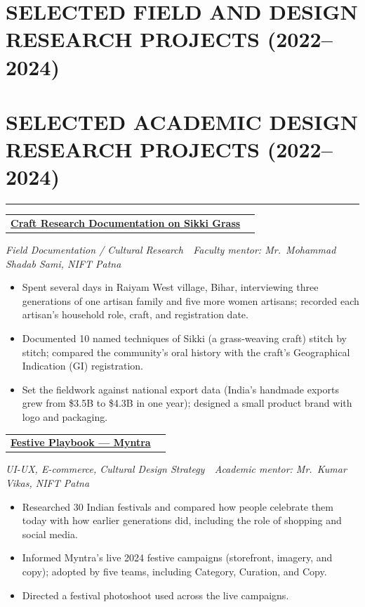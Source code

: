 \documentclass[10pt,letterpaper]{article}
\makeatletter
\newcommand{\weblink}[2]{\href{#1}{\textbf{#2}}}
\newcommand{\sectionrule}{\par\vspace{-2pt}\noindent\rule{\linewidth}{0.4pt}\par\vspace{2pt}}
\newenvironment{spread}[2][\normalsize]{\par\begingroup\linespread{#2}#1\selectfont}{\par\endgroup}
\newcommand{\entry}[2]{%
  \par\noindent
  \begin{tabularx}{\linewidth}{@{}X r@{}}
    \textbf{#1} & \normalfont #2
  \end{tabularx}\par
}
\newcommand{\entrygap}{\vspace{5pt}}
\newcommand{\subline}[1]{{\setlength{\rightskip}{2.7em}\itshape\small #1\par}\vspace{1pt}}
\makeatother
\begin{document}
\begin{spread}{1.07}
\ifdefined\EDRES \acceptedSection \else \preprintsSection \fi

\ifdefined\EDRES
\section{\MakeUppercase{Selected Field and Design Research Projects (2022--2024)}}
\else
\section{\MakeUppercase{Selected Academic Design Research Projects (2022--2024)}}
\fi
\sectionrule

\entry{\weblink{https://www.behance.net/gallery/248551173/Craft-Research-Documentation-on-Sikki-Grass}{Craft Research Documentation on Sikki Grass}}{2022}
\subline{Field Documentation / Cultural Research~\textbar\ Faculty mentor: Mr.\ Mohammad Shadab Sami, NIFT Patna}
\begin{itemize}
  \item Spent several days in Raiyam West village, Bihar, interviewing three generations of one artisan family and five more women artisans; recorded each artisan's household role, craft, and registration date.
  \item Documented 10 named techniques of Sikki (a grass-weaving craft) stitch by stitch; compared the community's oral history with the craft's Geographical Indication (GI) registration.
  \item Set the fieldwork against national export data (India's handmade exports grew from \$3.5B to \$4.3B in one year); designed a small product brand with logo and packaging.
\end{itemize}

\entrygap
{}
\entry{\weblink{https://www.behance.net/gallery/230430135/Festive-Playbook-Myntra}{Festive Playbook --- Myntra}}{2024}
\subline{UI-UX, E-commerce, Cultural Design Strategy~\textbar\ Academic mentor: Mr.\ Kumar Vikas, NIFT Patna}
\begin{itemize}
  \item Researched 30 Indian festivals and compared how people celebrate them today with how earlier generations did, including the role of shopping and social media.
  \item Informed Myntra's live 2024 festive campaigns (storefront, imagery, and copy); adopted by five teams, including Category, Curation, and Copy.
  \item Directed a festival photoshoot used across the live campaigns.
\end{itemize}


\end{spread}
\end{document}
